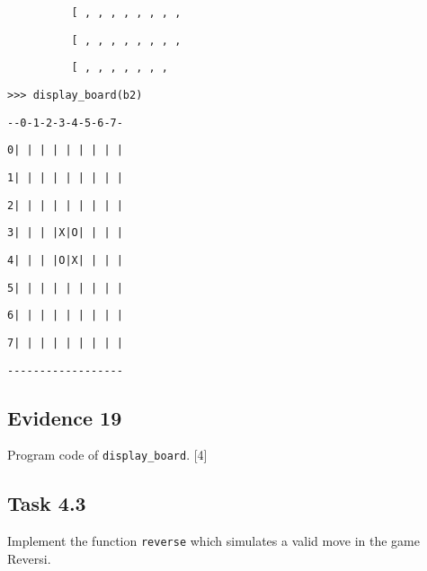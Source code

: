 \begin{minipage}[t]{1\columnwidth}
\texttt{~~~~~~~~~~{[}\textquotedbl{} \textquotedbl ,\textquotedbl{}
\textquotedbl ,\textquotedbl{} \textquotedbl ,\textquotedbl{} \textquotedbl ,\textquotedbl{}
\textquotedbl ,\textquotedbl{} \textquotedbl ,\textquotedbl{} \textquotedbl ,\textquotedbl{}
\textquotedbl{]}, }

\texttt{~~~~~~~~~~{[}\textquotedbl{} \textquotedbl ,\textquotedbl{}
\textquotedbl ,\textquotedbl{} \textquotedbl ,\textquotedbl{} \textquotedbl ,\textquotedbl{}
\textquotedbl ,\textquotedbl{} \textquotedbl ,\textquotedbl{} \textquotedbl ,\textquotedbl{}
\textquotedbl{]}, }

\texttt{~~~~~~~~~~{[}\textquotedbl{} \textquotedbl ,\textquotedbl{}
\textquotedbl ,\textquotedbl{} \textquotedbl ,\textquotedbl{} \textquotedbl ,\textquotedbl{}
\textquotedbl ,\textquotedbl{} \textquotedbl ,\textquotedbl{} \textquotedbl ,\textquotedbl{}
\textquotedbl{]}{]} }

\texttt{>\textcompwordmark >\textcompwordmark > display\_board(b2) }

\texttt{-{}-0-1-2-3-4-5-6-7- }

\texttt{0| | | | | | | | | }

\texttt{1| | | | | | | | | }

\texttt{2| | | | | | | | | }

\texttt{3| | | |X|O| | | | }

\texttt{4| | | |O|X| | | | }

\texttt{5| | | | | | | | | }

\texttt{6| | | | | | | | | }

\texttt{7| | | | | | | | |}

\texttt{-{}-{}-{}-{}-{}-{}-{}-{}-{}-{}-{}-{}-{}-{}-{}-{}-{}- }%
\end{minipage}

\subsection*{Evidence 19 }

Program code of \texttt{display\_board}.\hfill{} {[}4{]}

\subsection*{Task 4.3 }

Implement the function \texttt{reverse} which simulates a valid move
in the game Reversi.

